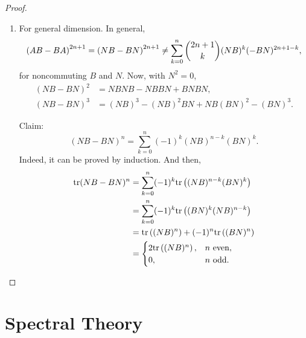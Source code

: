 \documentclass[11pt]{book}
\theoremstyle{definition}
\numberwithin{equation}{chapter}
\begin{document}
\begin{proof}
\begin{enumerate}[label=(\alph*)]
    \item For general dimension. In general,
    \begin{align*}
        \left(AB - BA\right)^{2n+1} = \left(NB - BN\right)^{2n+1} \neq \sum^n_{k=0} \dbinom{2n+1}{k} (NB)^k (-BN)^{2n+1-k},
    \end{align*}
    for noncommuting $B$ and $N$. Now, with $N^2 = 0$, 
    \begin{align*}
        (NB - BN)^2 & = NBNB - NBBN + BNBN, \\
        (NB - BN)^3 & = (NB)^3 - (NB)^2BN + NB(BN)^2 - (BN)^3.
    \end{align*}
    
    Claim: $$(NB - BN)^{n} = \sum^n_{k=0} (-1)^k (NB)^{n-k}(BN)^k.$$
    Indeed, it can be proved by induction. And then,
    \begin{align*}
        {\rm tr} (NB - BN)^{n} & = \sum^n_{k=0} (-1)^k {\rm tr} \left((NB)^{n-k}(BN)^k \right) \\
        & = \sum^n_{k=0} (-1)^k {\rm tr} \left((BN)^k (NB)^{n-k} \right) \\
        & = {\rm tr} \left((NB)^n\right) + (-1)^n {\rm tr} \left((BN)^n\right) \\
        & = \begin{cases}
            2 {\rm tr} \left((NB)^n\right), & n \,\, {\rm even}, \\
            0, & n \,\, {\rm odd}.
        \end{cases}
    \end{align*}
\end{enumerate}
\end{proof}

\medskip


\section{Spectral Theory}
\end{document}

